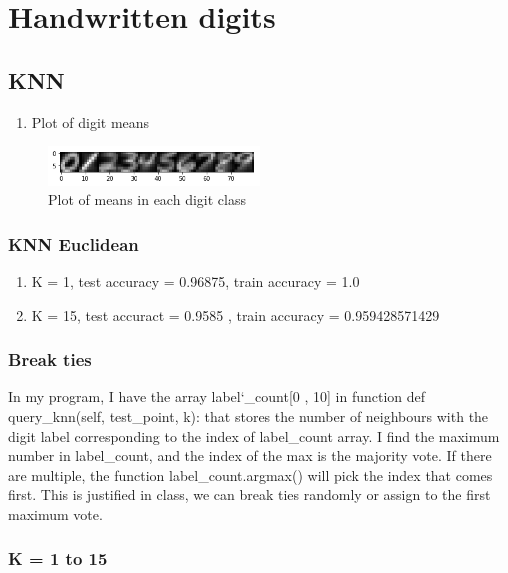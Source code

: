 \documentclass[letterpaper, 12]{article}
\begin{document}
\section{Handwritten digits}
\subsection{KNN}
\begin{enumerate}
\item Plot of digit means
\end{enumerate}

\begin{figure}[H]
\centering
\includegraphics[width=0.5\textwidth]{q2_0_nums.png}
\caption{\label{}Plot of means in each digit class}
\end{figure}



\subsubsection{KNN Euclidean}

\begin{enumerate}[label=(\alph*)]
\item K = 1, test accuracy = 0.96875, train accuracy = 1.0
\item K = 15, test accuract = 0.9585 , train accuracy  = 0.959428571429 
\end{enumerate}

\subsubsection{Break ties}
In my program, I have the array label\char`_count[0 , 10] in function def query\_knn(self, test\_point, k): that stores the number of neighbours with the digit label corresponding to the index of label\_count array. I find the maximum number in label\_count, and the index of the max is the majority vote. If there are multiple, the function label\_count.argmax() will pick the index that comes first. This is justified in class, we can break ties randomly or assign to the first maximum vote.

\subsubsection{K = 1 to 15}
\end{document}
